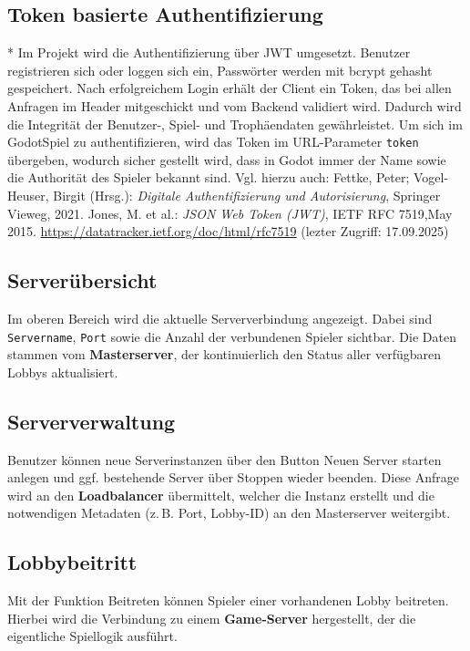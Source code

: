 \subsection{Token basierte Authentifizierung}*
Im Projekt wird die Authentifizierung über JWT umgesetzt.
Benutzer registrieren sich oder loggen sich ein, Passwörter werden mit bcrypt gehasht gespeichert.
Nach erfolgreichem Login erhält der Client ein Token, das bei allen Anfragen im Header mitgeschickt und vom Backend validiert wird.
Dadurch wird die Integrität der Benutzer-, Spiel- und Trophäendaten gewährleistet.
Um sich im GodotSpiel zu authentifizieren, wird das Token im URL-Parameter \texttt{token} übergeben, wodurch sicher gestellt wird, dass in Godot immer der Name sowie die Authorität des Spieler bekannt sind.
\noindent
Vgl. hierzu auch:  
Fettke, Peter; Vogel-Heuser, Birgit (Hrsg.): \textit{Digitale Authentifizierung und Autorisierung}, Springer Vieweg, 2021.  
Jones, M. et al.: \textit{JSON Web Token (JWT)}, IETF RFC 7519,May 2015. \url{https://datatracker.ietf.org/doc/html/rfc7519} (lezter Zugriff: 17.09.2025)

\subsection{Serverübersicht}
Im oberen Bereich wird die aktuelle Serververbindung angezeigt. 
Dabei sind \texttt{Servername}, \texttt{Port} sowie die Anzahl der verbundenen Spieler sichtbar.  
Die Daten stammen vom \textbf{Masterserver}, der kontinuierlich den Status aller verfügbaren Lobbys aktualisiert.

\subsection{Serververwaltung}
Benutzer können neue Serverinstanzen über den Button \glqq Neuen Server starten\grqq{} anlegen und ggf. bestehende Server über \glqq Stoppen\grqq{} wieder beenden.
Diese Anfrage wird an den \textbf{Loadbalancer} übermittelt, welcher die Instanz erstellt und die notwendigen Metadaten (z.\,B. Port, Lobby-ID) an den Masterserver weitergibt.

\subsection{Lobbybeitritt}
Mit der Funktion \glqq Beitreten\grqq{} können Spieler einer vorhandenen Lobby beitreten.  
Hierbei wird die Verbindung zu einem \textbf{Game-Server} hergestellt, der die eigentliche Spiellogik ausführt.  

